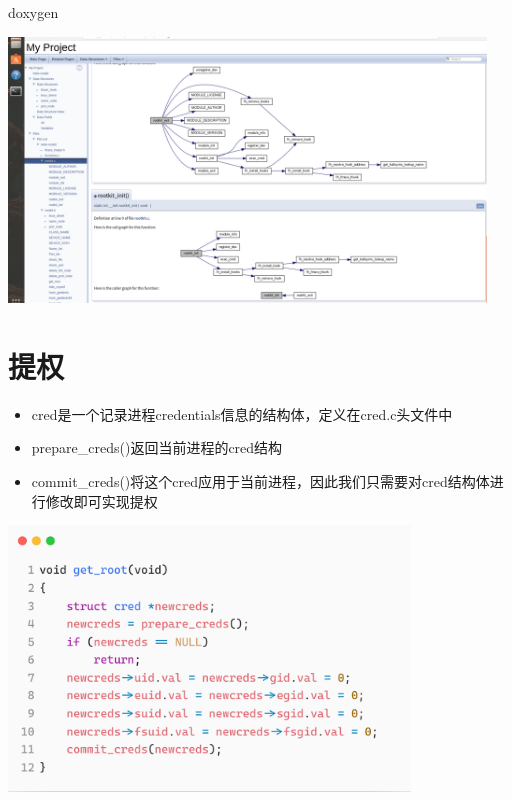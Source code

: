 \documentclass[11pt]{beamer}
\begin{document}
\begin{frame}{doxygen}
	\begin{itemize}
		\centering
		\includegraphics[width=0.95\textwidth]{pic/doxygen.png}
	\end{itemize}
\end{frame}

\section{提权}

\begin{frame}
    \begin{itemize}
        \item cred是一个记录进程credentials信息的结构体，定义在cred.c头文件中
        \item prepare\_creds()返回当前进程的cred结构
        \item commit\_creds()将这个cred应用于当前进程，因此我们只需要对cred结构体进行修改即可实现提权
    \end{itemize}
	\begin{itemize}
		\centering
		\includegraphics[width=0.80\textwidth]{pic/get-root.png}
	\end{itemize}
\end{frame}
\end{document}
